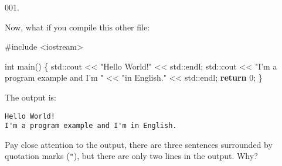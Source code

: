 \documentclass[]{book}
\newenvironment{Shaded}{}{}
\newcommand{\BuiltInTok}[1]{#1}
\newcommand{\ControlFlowTok}[1]{\textcolor[rgb]{0.00,0.44,0.13}{\textbf{#1}}}
\newcommand{\DataTypeTok}[1]{\textcolor[rgb]{0.56,0.13,0.00}{#1}}
\newcommand{\DecValTok}[1]{\textcolor[rgb]{0.25,0.63,0.44}{#1}}
\newcommand{\ImportTok}[1]{#1}
\newcommand{\NormalTok}[1]{#1}
\newcommand{\PreprocessorTok}[1]{\textcolor[rgb]{0.74,0.48,0.00}{#1}}
\newcommand{\StringTok}[1]{\textcolor[rgb]{0.25,0.44,0.63}{#1}}
\begin{document}
\begin{minipage}{\linewidth}\noindent
{\tiny 001.}\\
\begin{minipage}[t]{.485\linewidth}

Now, what if you compile this other file:

\begin{framed}

\begin{Shaded}
\begin{Highlighting}[]
\PreprocessorTok{#include }\ImportTok{<iostream>}

\DataTypeTok{int}\NormalTok{ main()}
\NormalTok{\{}
  \BuiltInTok{std::}\NormalTok{cout << }\StringTok{"Hello World!"}\NormalTok{ << }\BuiltInTok{std::}\NormalTok{endl;}
  \BuiltInTok{std::}\NormalTok{cout << }\StringTok{"I'm a program example and I'm "}
\NormalTok{            << }\StringTok{"in English."}
\NormalTok{            << }\BuiltInTok{std::}\NormalTok{endl;}
  \ControlFlowTok{return} \DecValTok{0}\NormalTok{;}
\NormalTok{\}}
\end{Highlighting}
\end{Shaded}

\end{framed}

\end{minipage}
\hfill
\begin{minipage}[t]{.485\linewidth}

The output is:

\begin{framed}

\begin{verbatim}
Hello World!
I'm a program example and I'm in English.
\end{verbatim}

\end{framed}

Pay close attention to the output, there are three sentences surrounded
by quotation marks (\texttt{"}), but there are only two lines in the
output. Why?

\end{minipage}
\end{minipage}

\vspace{2mm}\noindent\hrulefill{}
\end{document}
